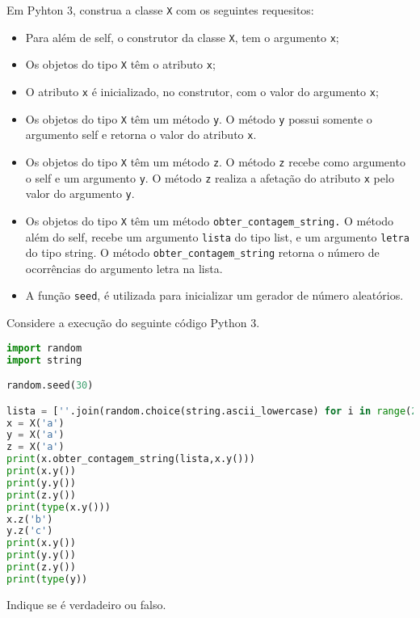\documentclass[12pt,varwidth=16cm,border=17pt]{standalone}
\begin{document}
Em Pyhton 3, construa a classe \verb+X+ com os seguintes requesitos:

\begin{itemize}

  \item Para além de self, o construtor da classe \verb+X+, tem o argumento \verb+x+;
  \item Os objetos do tipo \verb+X+ têm o atributo \verb+x+;
  \item O atributo \verb+x+ é inicializado, no construtor, com o valor
	do argumento \verb+x+;
  \item Os objetos do tipo \verb+X+ têm um método \verb+y+. O
    método \verb+y+ possui somente o argumento self e retorna o valor do atributo \verb+x+.
	
  \item Os objetos do tipo \verb+X+ têm um método \verb+z+. O
    método \verb+z+ recebe como argumento o self e um argumento \verb+y+. 
	O método \verb+z+ realiza a afetação do atributo \verb+x+ pelo valor do argumento \verb+y+.
    
 \item Os objetos do tipo \verb+X+ têm um método \verb+obter_contagem_string.+ O
    método além do self, recebe um argumento \verb+lista+ do tipo list, e um argumento \verb+letra+ do tipo string. O método \verb+obter_contagem_string+ retorna o número de ocorrências do argumento letra na lista.
    
 \item A função \verb+seed+, é utilizada para inicializar um gerador de número aleatórios.
    
\end{itemize}

Considere a execução do seguinte código Python 3.






\begin{lstlisting}[language=Python]
import random
import string

random.seed(30)

lista = [''.join(random.choice(string.ascii_lowercase) for i in range(2)) for i in range(300)]
x = X('a')
y = X('a')
z = X('a')
print(x.obter_contagem_string(lista,x.y()))
print(x.y())
print(y.y())
print(z.y())
print(type(x.y()))
x.z('b')
y.z('c')
print(x.y())
print(y.y())
print(z.y())
print(type(y))
\end{lstlisting}

Indique se é verdadeiro ou falso.
\end{document}

